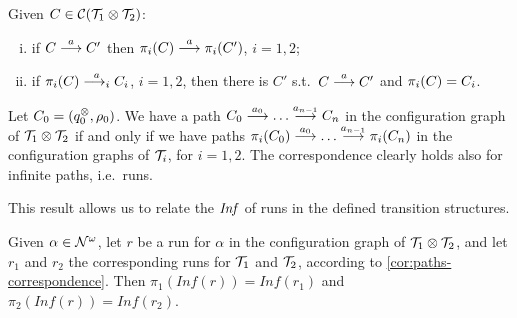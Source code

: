 \begin{proposition}
\label{prop:edges-correspondence}
Given $C \in \mathcal{C}(\mathcal{T}_1 \otimes \mathcal{T}_2)$:
\begin{enumerate}[(i)]
	\item if $C \overset{a}{\longrightarrow} C'$ then $\pi_i(C) \overset{a}{\longrightarrow} \pi_i(C')$, $i = 1,2$;
	\label{sync-to-each}
	\item if $\pi_i(C) \overset{a}{\longrightarrow_{i}} C_i$, $i=1,2$, 
	then there is $C'$ s.t.\ $C\overset{a}{\longrightarrow} C'$ and $\pi_i(C) = C_i$.
	\label{each-to-sync}
\end{enumerate}
\end{proposition}
%
\begin{corollary}
\label{cor:paths-correspondence}
Let $C_0 = (q_0^{\otimes},\rho_0)$. We have a path $C_0 \overset{a_0}{\longrightarrow} \dots \overset{a_{n-1}}{\longrightarrow} C_n$ in the configuration graph of $\mathcal{T}_1 \otimes \mathcal{T}_2$ if and only if we have paths $\pi_i(C_0) \overset{a_0}{\longrightarrow} \dots \overset{a_{n-1}}{\longrightarrow} \pi_i(C_n)$ in the configuration graphs of $\mathcal{T}_i$, for $i=1,2$. The correspondence clearly holds also for infinite paths, i.e.\ runs.
\end{corollary}
%
This result allows us to relate the $\mathit{Inf}$ of runs in the defined transition structures.%
%
\begin{theorem}
\label{thm:inf-correspondence}
Given $\alpha \in \mathcal{N}^\omega$, let $r$ be a run for $\alpha$ in the configuration graph of $\mathcal{T}_1 \otimes \mathcal{T}_2$, and let $r_1$ and $r_2$ the corresponding 
runs for $\mathcal{T}_1$ and $\mathcal{T}_2$, according to \cref{cor:paths-correspondence}. Then $\pi_1(Inf(r)) = Inf(r_1)$ and $\pi_2(Inf(r)) = Inf(r_2)$.
\end{theorem}